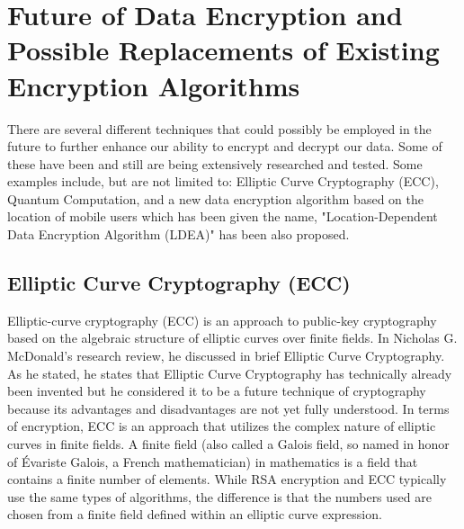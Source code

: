 \documentclass[journal]{IEEEtran}
\begin{document}
\section{\textbf{Future of Data Encryption and Possible Replacements of Existing Encryption Algorithms}}
There are several different techniques that could possibly be employed in the future to further enhance our ability to encrypt and decrypt our data. Some of these have been and still are being extensively researched and tested. Some examples include, but are not limited to: Elliptic Curve Cryptography (ECC), Quantum Computation, and a new data encryption algorithm based on the location of mobile users which has been given the name, "Location-Dependent Data Encryption Algorithm (LDEA)" has been also proposed. 
\subsection{\textbf{Elliptic Curve Cryptography (ECC)}}
Elliptic-curve cryptography (ECC) is an approach to public-key cryptography based on the algebraic structure of elliptic curves over finite fields. In Nicholas G. McDonald's research review, he discussed in brief Elliptic Curve Cryptography. As he stated, he states that Elliptic Curve Cryptography has technically already been invented but he considered it to be a future technique of cryptography because its advantages and disadvantages are not yet fully understood. In terms of encryption, ECC is an approach that utilizes the complex nature of elliptic curves in finite fields. A finite field (also called a Galois field, so named in honor of Évariste Galois, a French mathematician) in mathematics is a field that contains a finite number of elements. While RSA encryption and ECC typically use the same types of algorithms, the difference is that the numbers used are chosen from a finite field defined within an elliptic curve expression.
\end{document}
